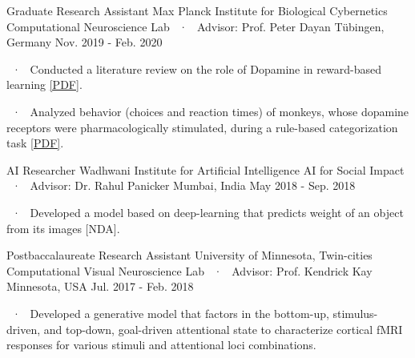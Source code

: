 \begin{cventries}
  \cventryLab
    {Graduate Research Assistant} %
    {Max Planck Institute for Biological Cybernetics} %
    {Computational Neuroscience Lab ~·~ Advisor: Prof. Peter Dayan}%
    {Tübingen, Germany} %
    {Nov. 2019 - Feb. 2020}
    {%
    \begin{cvitems}
    \item ~·~ Conducted a literature review on the role of Dopamine in reward-based learning \href{https://drive.google.com/file/d/1OEo0gj_9koHtPa58SKOdccETzw48jGHZ/view?usp=sharing}{[PDF]}. 
    \item ~·~ Analyzed behavior (choices and reaction times) of monkeys, whose dopamine receptors were pharmacologically stimulated, during a rule-based categorization task \href{https://drive.google.com/file/d/1bqvoALW3b3Ovm6vpJbzl-hcy932nN__t/view?usp=sharing}{[PDF]}. 
    \end{cvitems}
    }

  \cventryLab
    {AI Researcher} %
    {Wadhwani Institute for Artificial Intelligence} %
    {AI for Social Impact ~·~ Advisor: Dr. Rahul Panicker} %
    {Mumbai, India} %
    {May 2018 - Sep. 2018} %
    { %
      \begin{cvitems}
      \item ~·~ Developed a model based on deep-learning that predicts weight of an object from its images [NDA].
      \end{cvitems}
    }
    
  \cventryLab
    {Postbaccalaureate Research Assistant} %
    {University of Minnesota, Twin-cities} %
    {Computational Visual Neuroscience Lab ~·~ Advisor: Prof. Kendrick Kay} %
    {Minnesota, USA} %
    {Jul. 2017 - Feb. 2018} %
    { %
      \begin{cvitems}
      \item ~·~  Developed a generative model that factors in the bottom-up, stimulus-driven, and top-down, goal-driven attentional state to characterize cortical fMRI responses for various stimuli and attentional loci combinations. 
      \end{cvitems}
    }
    

\end{cventries}

